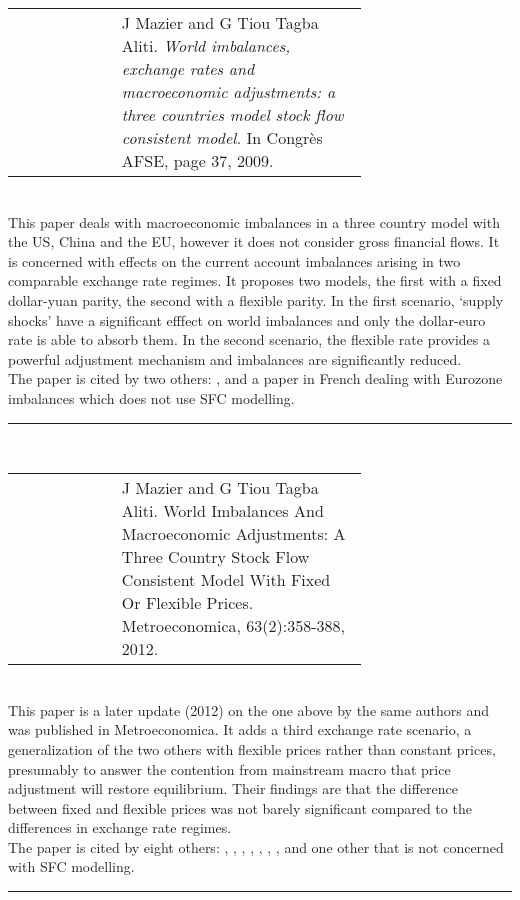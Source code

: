 \documentclass[twoside,a4paper,11pt]{article}
\begin{document}
\begin{tabular}{lp{0.7\linewidth}}
\cite{Mazier2009b} &  J Mazier and G Tiou Tagba Aliti. \textit{World imbalances, exchange
rates and macroeconomic adjustments: a three countries model stock  flow consistent model.} In Congr\`es AFSE, page 37, 2009. 
\end{tabular}\\[5pt]
This paper deals with macroeconomic imbalances in a three country model with the US, China and the EU, however it does not consider gross financial flows. It is concerned with effects on the current account imbalances arising in two comparable exchange rate regimes.  It proposes two models, the first with a fixed dollar-yuan parity, the second with a flexible parity. In the first scenario, `supply shocks' have a significant efffect on world imbalances and only the dollar-euro rate is able to absorb them. In the second scenario, the flexible rate provides a powerful adjustment mechanism and imbalances are significantly reduced.\\[5pt]
The paper is cited by two others: \cite{Lavoie2010a}, and a paper in French dealing with Eurozone imbalances which does not use SFC modelling.
\begin{center}
\rule{10cm}{1pt}  \\[5pt]
\end{center}

 \begin{tabular}{lp{0.7\linewidth}}
\cite{Mazier2012b} & J Mazier and G Tiou Tagba Aliti. World Imbalances And Macroeconomic Adjustments:
A Three Country Stock Flow Consistent Model With Fixed Or Flexible Prices.
Metroeconomica, 63(2):358-388, 2012.
\end{tabular}\\[5pt]
This paper is a later update (2012)  on the one above by the same authors and was published in Metroeconomica. It adds a third exchange rate scenario, a generalization of the two others with flexible prices rather than constant prices, presumably to answer the contention from mainstream macro that price adjustment will restore equilibrium. Their findings are that the difference between fixed and flexible prices was not barely significant compared to the differences in exchange rate regimes.\\[5pt]
The paper is cited by eight others: 
 \cite{Caverzasi2013},
 \cite{Caverzasi2014a},
 \cite{Benassy-Quere2013},
 \cite{Mazier2015},
 \cite{Kinsella2012a},
  \cite{Valdecantos2015b},
 \cite{Halporn2012},
 and one other that is not concerned with SFC modelling.
\begin{center}
\rule{10cm}{1pt}  \\[5pt]
\end{center}
\end{document}
